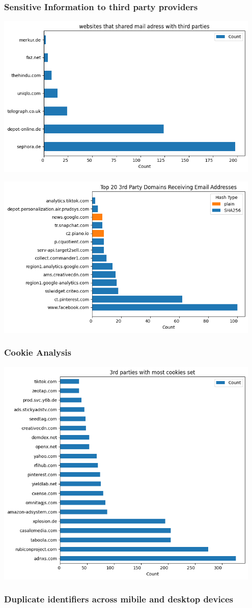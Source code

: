 \subsubsection{Sensitive Information to third party providers}
\includegraphics[width=0.95\textwidth]{./assets/websitesSharingMailAddresses.png}

\includegraphics[width=0.95\textwidth]{./assets/top20thirdpartydomainsreceivingmailaddresses.png}

\subsubsection{Cookie Analysis}
\includegraphics[width=0.95\textwidth]{./assets/thirdpartieswithmostcookiesset.png}

\subsubsection{Duplicate identifiers across mibile and desktop devices}